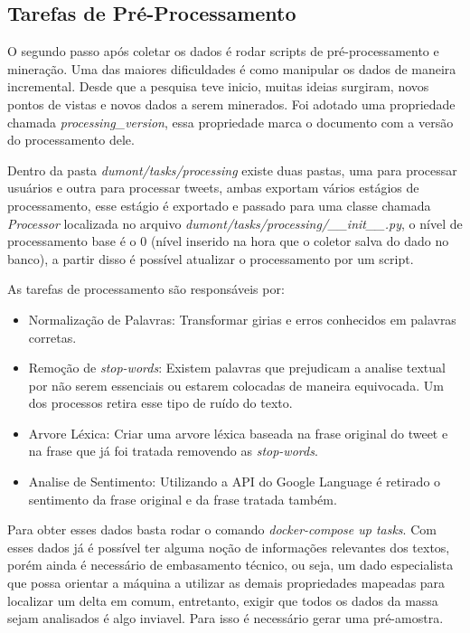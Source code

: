 \subsection{Tarefas de Pré-Processamento}
O segundo passo após coletar os dados é rodar scripts de pré-processamento e mineração. Uma das maiores dificuldades é como manipular os dados de maneira incremental. Desde que a pesquisa teve inicio, muitas ideias surgiram, novos pontos de vistas e novos dados a serem minerados. Foi adotado uma propriedade chamada \textit{processing\_version}, essa propriedade marca o documento com a versão do processamento dele.

Dentro da pasta \textit{dumont/tasks/processing} existe duas pastas, uma para processar usuários e outra para processar tweets, ambas exportam vários estágios de processamento, esse estágio é exportado e passado para uma classe chamada \textit{Processor} localizada no arquivo \textit{dumont/tasks/processing/\_\_init\_\_.py}, o nível de processamento base é o 0 (nível inserido na hora que o coletor salva do dado no banco), a partir disso é possível atualizar o processamento por um script.

As tarefas de processamento são responsáveis por:

\begin{itemize}
    \item Normalização de Palavras: Transformar girias e erros conhecidos em palavras corretas.
    \item Remoção de \textit{stop-words}: Existem palavras que prejudicam a analise textual por não serem essenciais ou estarem colocadas de maneira equivocada. Um dos processos retira esse tipo de ruído do texto.
    \item Arvore Léxica: Criar uma arvore léxica baseada na frase original do tweet e na frase que já foi tratada removendo as \textit{stop-words}.
    \item Analise de Sentimento: Utilizando a API do Google Language é retirado o sentimento da frase original e da frase tratada também.
\end{itemize}

Para obter esses dados basta rodar o comando \textit{docker-compose up tasks}. Com esses dados já é possível ter alguma noção de informações relevantes dos textos, porém ainda é necessário de embasamento técnico, ou seja, um dado especialista que possa orientar a máquina a utilizar as demais propriedades mapeadas para localizar um delta em comum, entretanto, exigir que todos os dados da massa sejam analisados é algo inviavel. Para isso é necessário gerar uma pré-amostra.